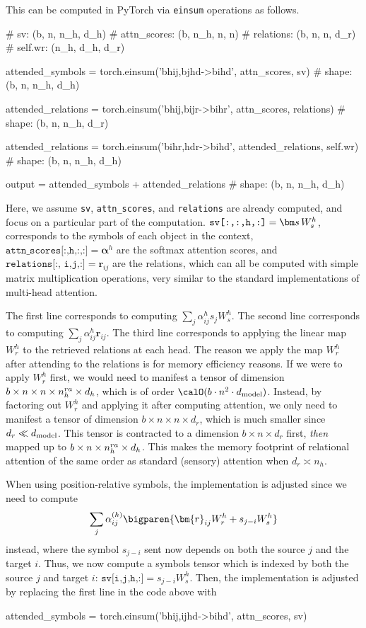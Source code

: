 This can be computed in PyTorch via \texttt{einsum} operations as follows.
\begin{python}
# sv: (b, n, n_h, d_h)
# attn_scores: (b, n_h, n, n)
# relations: (b, n, n, d_r)
# self.wr: (n_h, d_h, d_r)

attended_symbols = torch.einsum('bhij,bjhd->bihd', attn_scores, sv)
# shape: (b, n, n_h, d_h)

attended_relations = torch.einsum('bhij,bijr->bihr', attn_scores, relations)
# shape: (b, n, n_h, d_r)

attended_relations = torch.einsum('bihr,hdr->bihd', attended_relations, self.wr)
# shape: (b, n, n_h, d_h)

output = attended_symbols + attended_relations
# shape: (b, n, n_h, d_h)
\end{python}

Here, we assume \texttt{sv}, \texttt{attn\_scores}, and \texttt{relations} are already computed, and focus on a particular part of the computation. $\texttt{sv[:,:,h,:]} = \s \,W_s^h$, corresponds to the symbols of each object in the context, $\texttt{attn\_scores[:,h,:,:]} = \bm{\alpha}^h$ are the softmax attention scores, and $\texttt{relations[:, i,j,:]} = \bm{r}_{ij}$ are the relations, which can all be computed with simple matrix multiplication operations, very similar to the standard implementations of multi-head attention.

The first line corresponds to computing $\sum_{j} \alpha_{ij}^h s_j W_s^h$. The second line corresponds to computing $\sum_{j} \alpha_{ij}^h \bm{r}_{ij}$. The third line corresponds to applying the linear map $W_r^h$ to the retrieved relations at each head. The reason we apply the map $W_r^h$ after attending to the relations is for memory efficiency reasons. If we were to apply $W_r^h$ first, we would need to manifest a tensor of dimension $b \times n \times n \times n_h^{ra} \times d_h$, which is of order $\calO(b \cdot n^2 \cdot \dmodel)$. Instead, by factoring out $W_r^h$ and applying it after computing attention, we only need to manifest a tensor of dimension $b \times n \times n \times d_r$, which is much smaller since $d_r \ll d_{\mathrm{model}}$. This tensor is contracted to a dimension $b \times n \times d_r$ first, \textit{then} mapped up to $b \times n  \times n_h^{ra} \times d_h$. This makes the memory footprint of relational attention of the same order as standard (sensory) attention when $d_r \asymp n_h$.

When using position-relative symbols, the implementation is adjusted since we need to compute
\begin{equation}
    \sum_{j} \alpha_{ij}^{(h)} \bigparen{\bm{r}_{ij} W_r^h + s_{j-i} W_s^h}
\end{equation}
instead, where the symbol $s_{j-i}$ sent now depends on both the source $j$ and the target $i$. Thus, we now compute a symbols tensor which is indexed by both the source $j$ and target $i$: $\texttt{sv[i,j,h,:]} = s_{j-i} W_s^h$. Then, the implementation is adjusted by replacing the first line in the code above with
\begin{python}
    attended_symbols = torch.einsum('bhij,ijhd->bihd', attn_scores, sv)
\end{python}

